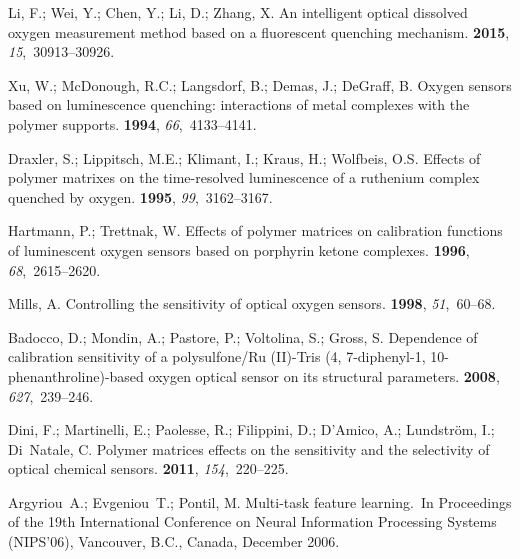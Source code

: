 \documentclass[sensors,article,accept,moreauthors,pdftex,10pt,a4paper]{Definitions/mdpi}
\theoremstyle{definition}
\begin{document}
\begin{thebibliography}{999}
Li, F.; Wei, Y.; Chen, Y.; Li, D.; Zhang, X.
\newblock An intelligent optical dissolved oxygen measurement method based on a
  fluorescent quenching mechanism.
 {\bf 2015}, {\em 15},~30913--30926.

Xu, W.; McDonough, R.C.; Langsdorf, B.; Demas, J.; DeGraff, B.
\newblock Oxygen sensors based on luminescence quenching: interactions of metal
  complexes with the polymer supports.
 {\bf 1994}, {\em 66},~4133--4141.

Draxler, S.; Lippitsch, M.E.; Klimant, I.; Kraus, H.; Wolfbeis, O.S.
\newblock Effects of polymer matrixes on the time-resolved luminescence of a
  ruthenium complex quenched by oxygen.
 {\bf 1995}, {\em
  99},~3162--3167.

Hartmann, P.; Trettnak, W.
\newblock Effects of polymer matrices on calibration functions of luminescent
  oxygen sensors based on porphyrin ketone complexes.
 {\bf 1996}, {\em 68},~2615--2620.

Mills, A.
\newblock Controlling the sensitivity of optical oxygen sensors.
 {\bf 1998}, {\em 51},~60--68.

Badocco, D.; Mondin, A.; Pastore, P.; Voltolina, S.; Gross, S.
\newblock Dependence of calibration sensitivity of a polysulfone/Ru (II)-Tris
  (4, 7-diphenyl-1, 10-phenanthroline)-based oxygen optical sensor on its
  structural parameters.
 {\bf 2008}, {\em 627},~239--246.

Dini, F.; Martinelli, E.; Paolesse, R.; Filippini, D.; D’Amico, A.;
  Lundstr{\"o}m, I.; Di~Natale, C.
\newblock Polymer matrices effects on the sensitivity and the selectivity of
  optical chemical sensors.
 {\bf 2011}, {\em
  154},~220--225.

Argyriou~A.; Evgeniou~T.; Pontil, M.
\newblock Multi-task feature learning.~\newblock In Proceedings of the 19th International Conference on Neural
  Information Processing Systems (NIPS'06), Vancouver, B.C., Canada, December 2006. %


\end{thebibliography}
\end{document}
